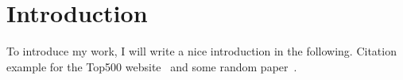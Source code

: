 \chapter{Introduction}
\label{chapter:introduction}

To introduce my work, I will write a nice introduction in the following.
Citation example for the Top500 website~\cite{top500} and some random paper~\cite{graham1969}.
